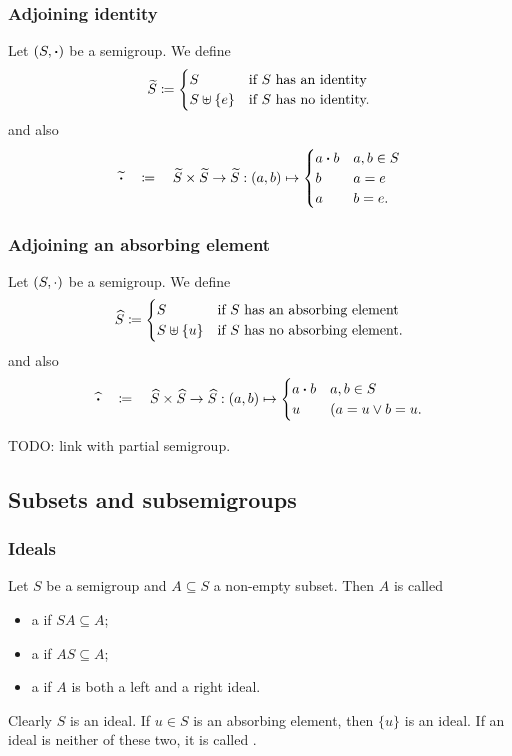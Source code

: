 \subsubsection{Adjoining identity}
\begin{definition}
Let $\sSet{S,\boldsymbol{\cdot}}$ be a semigroup. We define
\[ \widetilde{S} \coloneqq \begin{cases}
S & \text{if $S$ has an identity} \\
S\uplus \{e\} & \text{if $S$ has no identity.}
\end{cases} \]
and also
\[ \widetilde{\boldsymbol{\cdot}} \quad\coloneqq\quad \widetilde{S}\times \widetilde{S}\to \widetilde{S}: (a,b) \mapsto \begin{cases}
a\boldsymbol{\cdot} b & a,b\in S \\
b & a = e \\
a & b = e.
\end{cases} \]
\end{definition}


\subsubsection{Adjoining an absorbing element}
\begin{definition}
Let $\sSet{S,\cdot}$ be a semigroup. We define
\[ \widehat{S} \coloneqq \begin{cases}
S & \text{if $S$ has an absorbing element} \\
S\uplus \{u\} & \text{if $S$ has no absorbing element.}
\end{cases} \]
and also
\[ \widehat{\boldsymbol{\cdot}} \quad\coloneqq\quad \widehat{S}\times \widehat{S}\to \widehat{S}: (a,b) \mapsto \begin{cases}
a\boldsymbol{\cdot} b & a,b\in S \\
u & (a = u \lor b = u.
\end{cases} \]
\end{definition}

TODO: link with partial semigroup.

\subsection{Subsets and subsemigroups}
\subsubsection{Ideals}
\begin{definition}
Let $S$ be a semigroup and $A\subseteq S$ a non-empty subset. Then $A$ is called
\begin{itemize}
\item a  if $SA \subseteq A$;
\item a  if $AS \subseteq A$;
\item a  if $A$ is both a left and a right ideal.
\end{itemize}
Clearly $S$ is an ideal. If $u\in S$ is an absorbing element, then $\{u\}$ is an ideal. If an ideal is neither of these two, it is called .
\end{definition}

